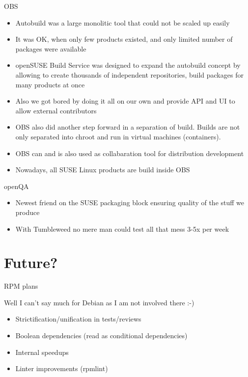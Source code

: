 \documentclass{beamer}
\begin{document}
\begin{frame}[t]{OBS}
	\begin{itemize}
	\item Autobuild was a large monolitic tool that could not be scaled up easily
	\item It was OK, when only few products existed, and only limited number of packages were available
	\item openSUSE Build Service was designed to expand the autobuild concept by allowing to create thousands of independent repositories, build packages for many products at once
	\item Also we got bored by doing it all on our own and provide API and UI to allow external contributors
	\item OBS also did another step forward in a separation of build. Builds are not only separated into chroot and run in virtual machines (containers).
	\item OBS can and is also used as collabaration tool for distribution development
	\item Nowadays, all SUSE Linux products are build inside OBS
	\end{itemize}
\end{frame}

\begin{frame}[t]{openQA}
	\begin{itemize}
	\item Newest friend on the SUSE packaging block ensuring quality of the stuff we produce
	\item With Tumbleweed no mere man could test all that mess 3-5x per week
	\end{itemize}
\end{frame}

\section{Future?}

\begin{frame}[t]{RPM plans}
    \begin{center}Well I can't say much for Debian as I am not involved there :-)\end{center}
	\begin{itemize}
	\item Strictification/unification in tests/reviews
	\item Boolean dependencies (read as conditional dependencies)
	\item Internal speedups
	\item Linter improvements (rpmlint)
	\end{itemize}
\end{frame}
\end{document}
